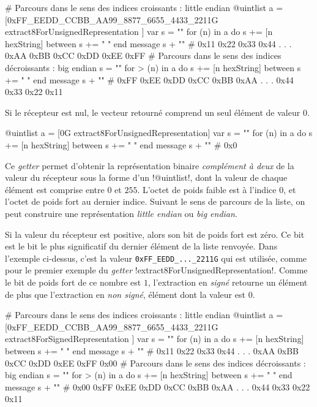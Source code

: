 \begin{galgas}
# Parcours dans le sens des indices croissants : little endian
@uintlist a = [0xFF_EEDD_CCBB_AA99_8877_6655_4433_2211G
  extract8ForUnsignedRepresentation
]
var s = ""
for (n) in a
  do s += [n hexString]
  between s += " "
end
message s + "\n" # 0x11 0x22 0x33 0x44 . . . 0xAA 0xBB 0xCC 0xDD 0xEE 0xFF 
# Parcours dans le sens des indices décroissants : big endian
s = ""
for > (n) in a
  do s += [n hexString]
  between s += " "
end
message s + "\n" # 0xFF 0xEE 0xDD 0xCC 0xBB 0xAA . . . 0x44 0x33 0x22 0x11
\end{galgas}

Si le récepteur est nul, le vecteur retourné comprend un seul élément de valeur $0$.

\begin{galgas}
@uintlist a = [0G extract8ForUnsignedRepresentation]
var s = ""
for (n) in a
  do s += [n hexString]
  between s += " "
end
message s + "\n" # 0x0
\end{galgas}


Ce \emph{getter} permet d'obtenir la représentation binaire \emph{complément à deux} de la valeur du récepteur sous la forme d'un \ggs!@uintlist!, dont la valeur de chaque élément est comprise entre $0$ et $255$. L'octet de poids faible est à l'indice $0$, et l'octet de poids fort au dernier indice. Suivant le sens de parcours de la liste, on peut construire une représentation \emph{little endian} ou \emph{big endian}.

Si la valeur du récepteur est positive, alors son bit de poids fort est zéro. Ce bit est le bit le plus significatif du dernier élément de la liste renvoyée. Dans l'exemple ci-dessus, c'est la valeur \texttt{0xFF\_EEDD\_...\_2211G} qui est utilisée, comme pour le premier exemple du \emph{getter} \ggs!extract8ForUnsignedRepresentation!. Comme le bit de poids fort de ce nombre est $1$, l'extraction en \emph{signé} retourne un élément de plus que l'extraction en \emph{non signé}, élément dont la valeur est $0$.

\begin{galgas}
# Parcours dans le sens des indices croissants : little endian
@uintlist a = [0xFF_EEDD_CCBB_AA99_8877_6655_4433_2211G
  extract8ForSignedRepresentation
]
var s = ""
for (n) in a
  do s += [n hexString]
  between s += " "
end
message s + "\n" # 0x11 0x22 0x33 0x44 . . . 0xAA 0xBB 0xCC 0xDD 0xEE 0xFF 0x00
# Parcours dans le sens des indices décroissants : big endian
s = ""
for > (n) in a
  do s += [n hexString]
  between s += " "
end
message s + "\n" # 0x00 0xFF 0xEE 0xDD 0xCC 0xBB 0xAA . . . 0x44 0x33 0x22 0x11
\end{galgas}

